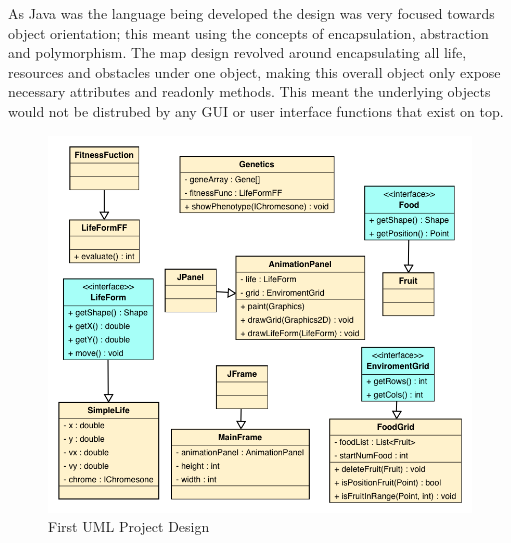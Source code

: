 \documentclass[12pt]{article}
\begin{document}
As Java was the language being developed the design was very focused towards object orientation; this meant using the concepts 
of encapsulation, abstraction and polymorphism. The map design revolved around encapsulating all life, resources and obstacles 
under one object, making this overall object only expose necessary attributes and readonly methods. This meant the underlying 
objects would not be distrubed by any GUI or user interface functions that exist on top.  

\begin{figure} [ht]
\centering
\includegraphics[scale = 0.5]{uml1.png}
\caption{First UML Project Design}
\label{fig:umldiag1}
\end{figure}
\end{document}
